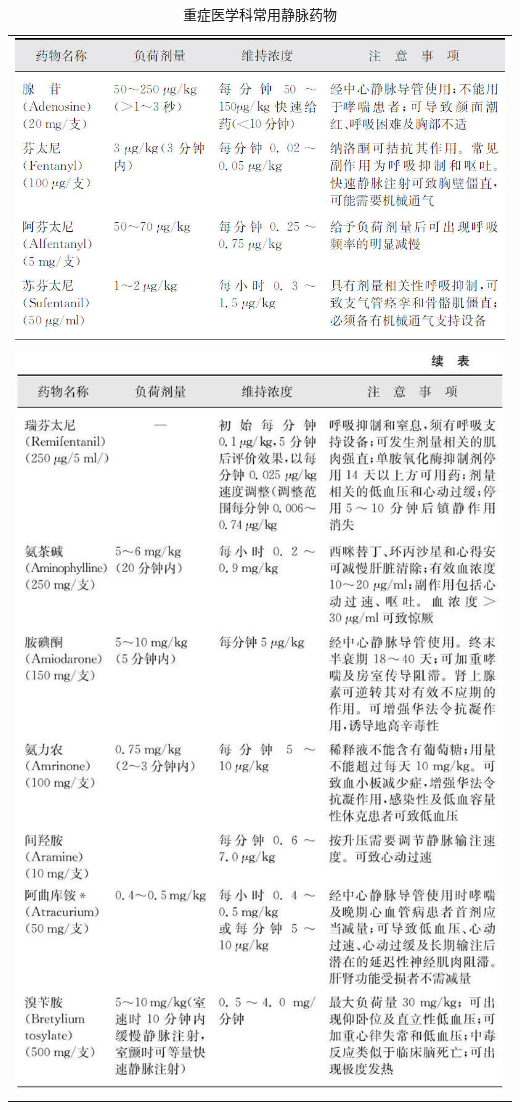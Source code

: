 \begin{longtable}{c}
  \caption{重症医学科常用静脉药物}
  \label{tabapp-17}
  \endfirsthead
  \caption[]{重症医学科常用静脉药物}
  \endhead
\includegraphics[width=\textwidth,height=\textheight,keepaspectratio]{./images/Image00323.jpg}\\
\includegraphics[width=\textwidth,height=\textheight,keepaspectratio]{./images/Image00324.jpg}\\

\end{longtable}
